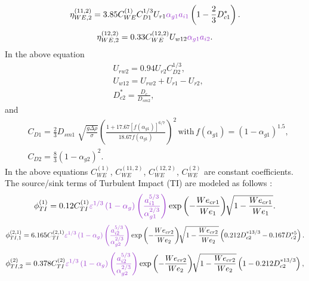 \begin{equation}
 \eta_{WE,2}^{(11,2)} = 3.85 C_{WE}^{(1)} C_{D1}^{1/3} U_{r1} {\color{mydarkorchid}\alpha_{g1} a_{i1}} \left( 1 - \frac{2}{3} D_{c1}^{*} \right).
\end{equation}
\begin{equation}
\eta_{WE,2}^{(12,2)} = 0.33 C_{WE}^{(12,2)} U_{w12} {\color{mydarkorchid} \alpha_{g1} a_{i2}}.
\end{equation}
In the above equation
 \begin{align*}
 & U_{rw2} = 0.94 U_{r2} C_{D2}^{1/3}, \\
 & U_{w12} = U_{rw2} + U_{r1} - U_{r2}, \\
 & D_{c2}^{*}=\frac{D_c}{D_{sm2}},
 \end{align*}
 and
 \begin{align*}
 & C_{D1} = \frac{2}{3} D_{sm1} \sqrt[]{ \frac{ g \Delta \rho }{ \sigma} } \left( \frac{ 1+17.67 [f(\alpha_{g1})]^{6/7} }{ 18.67 f(\alpha_{g1}) } \right)^2 \, \text{with} \, f(\alpha_{g1}) = (1 - \alpha_{g1})^{1.5}, \\
 & C_{D2} = \frac{8}{3} (1-\alpha_{g2})^2.
 \end{align*}
In the above equations $C_{WE}^{(1)}$, $C_{WE}^{(11,2)}$, $C_{WE}^{(12,2)}$, $C_{WE}^{(2)}$ are constant coefficients. \\
The source/sink terms of Turbulent Impact (TI) are modeled as follows :
\begin{equation}
 \phi_{TI}^{(1)} = 0.12 C_{TI}^{(1)} {\color{mydarkorchid}\varepsilon^{1/3}  \left( 1-\alpha_g \right) \left( \frac{ a_{i1}^{5/3} }{ \alpha_{g1}^{2/3} } \right)} \exp \left( - \frac{ We_{cr1} }{ We_1 } \right) \sqrt[]{ 1 - \frac{ We_{cr1} }{ We_1 } }.
 \end{equation}
\begin{equation}
\phi_{TI,1}^{(2,1)} = 6.165 C_{TI}^{(2,1)} {\color{mydarkorchid}\varepsilon^{1/3} \left( 1 - \alpha_g \right) \left( \frac{ a_{i2}^{5/3} }{ \alpha_{g2}^{2/3} } \right)} \exp \left( - \frac{ We_{cr2} }{ We_2 } \right) \sqrt[]{ 1 - \frac{ We_{cr2} }{ We_2 } } \left( 0.212 D_{c2}^{*13/3} - 0.167 D_{c2}^{*5} \right).
 \end{equation}
 \begin{equation}
 \phi_{TI,2}^{(2)} = 0.378 C_{TI}^{(2)} {\color{mydarkorchid}\varepsilon^{1/3} \left( 1-\alpha_g \right) \left( \frac{ a_{i2}^{5/3} }{ \alpha_{g2}^{2/3} } \right)} \exp \left( - \frac{ We_{cr2} }{ We_2 } \right) \sqrt[]{ 1 - \frac{ We_{cr2} }{ We_2 } } \left( 1 - 0.212 D_{c2}^{*13/3} \right),
 \end{equation}

